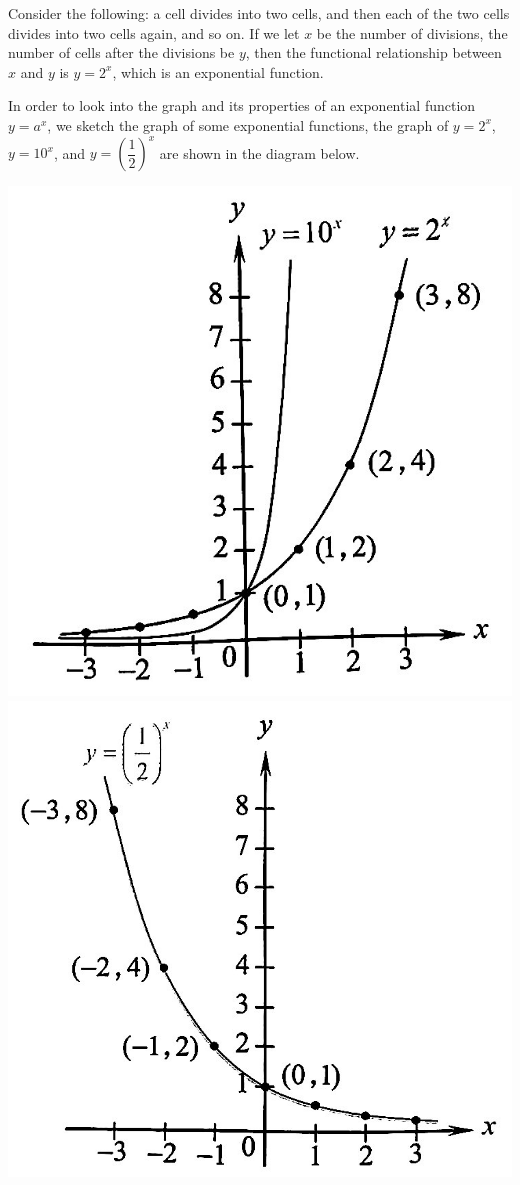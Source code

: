 \documentclass[12pt]{report}
\begin{document}
Consider the following: a cell divides into two cells, and then each of the two
cells divides into two cells again, and so on. If we let $x$ be the number of
divisions, the number of cells after the divisions be $y$, then the functional
relationship between $x$ and $y$ is $y = 2^x$, which is an exponential
function.

In order to look into the graph and its properties of an exponential function
$y = a^x$, we sketch the graph of some exponential functions, the graph of $y =
    2^x$, $y = 10^x$, and $y = {\left(\dfrac{1}{2}\right)}^x$ are shown in the
diagram below.

\begin{center}
    \includegraphics[scale=0.3]{./assets/expo1.jpeg}
    \hspace{1cm}
    \includegraphics[scale=0.3]{./assets/expo2.jpeg}
\end{center}
\end{document}
